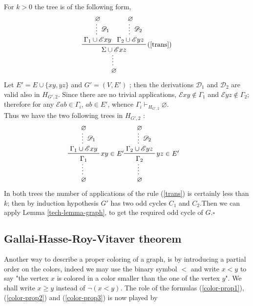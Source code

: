 \documentclass[a4paper,12pt,oneside]{book}
\newcommand{\E}{\mathscr{E}}
\newcommand{\D}{\mathscr{D}}
\newcommand*{\QED}{\hfill\ensuremath{\square}}
\let\emptyset\varnothing
\begin{document}
For $k >0$ the tree is of the following form, 
$$
\prftree[r]{(\ref{trans})}
{\prfsummary[$\D_1$]{\emptyset}{\Gamma_1 \cup \E xy }}
{\prfsummary[$\D_2$]{\emptyset}{\Gamma_2 \cup \E yz }}
{\prfsummary{\Sigma \cup \E xz }{\emptyset}}
$$
Let $E'=E\cup\{xy,yz\}$ and $G'=(V,E' )$ ; then the derivations $\D_1$ and $\D_2$ are valid also in $H_{G',2}$. 
Since there are no trivial applications, $\E xy \notin \Gamma_1 $ and $\E yz \notin \Gamma_2 $; therefore for any $\E ab \in \Gamma_i$, $ab \in E'$, whence $\Gamma_i \vdash_{H_{G',2}} \emptyset$. \\Thus we have the two following trees in  $H_{G',2}$ :
\begin{eqnarray*}
\prfsummary{
\prftree[r]{$xy \in E'$}{\prfsummary[$\D_1$]{\emptyset}{\Gamma_1 \cup \E xy}}{\Gamma_1}}
{\emptyset}
&\prfsummary{
\prftree[r]{$yz \in E'$}{\prfsummary[$\D_2$]{\emptyset}{\Gamma_2 \cup\E yz}}{\Gamma_2}}
{\emptyset}
\end{eqnarray*}
In both trees the number of applications of the rule (\ref{trans}) is certainly less than $k$; then by induction hypothesis $G'$ has two odd cycles $C_1$ and $C_2$.Then we can apply Lemma  \ref{tech-lemma-graph}, to get the required odd cycle of $G$.\QED


\subsection*{Gallai-Hasse-Roy-Vitaver theorem}

Another way to describe a proper coloring of a graph, is by introducing a partial order on the colors, indeed we may use the binary symbol $<$ and write $x<y$ to say "the vertex $x$ is colored in a color smaller than the one of the vertex $y$". We shall write $x\geq y $ instead of $\neg (x<y)$. The role of the formulas (\ref{color-prop1}), (\ref{color-prop2}) and (\ref{color-prop3}) is now played by 
\end{document}
